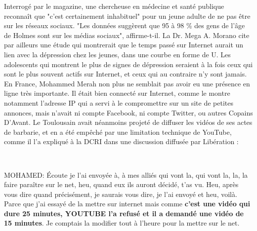 \documentclass[11pt,twoside,a4paper]{article}
\begin{document}
Interrog{\'e} par le magazine, une chercheuse en m{\'e}decine et sant{\'e} publique reconna{\^i}t que "c'est certainement inhabituel" pour un jeune adulte de ne pas {\^e}tre sur les r{\'e}seaux sociaux. "Les donn{\'e}es sugg{\`e}rent que 95 {\`a} 98 \% des gens de l'{\^a}ge de Holmes sont sur les m{\'e}dias sociaux", affirme-t-il. La Dr. Mega A. Morano cite par ailleurs une {\'e}tude qui montrerait que le temps pass{\'e} sur Internet aurait un lien avec la d{\'e}pression chez les jeunes, dans une courbe en forme de U. Les adolescents qui montrent le plus de signes de d{\'e}pression seraient {\`a} la fois ceux qui sont le plus souvent actifs sur Internet, et ceux qui au contraire n'y sont jamais.~\\ 

En France, Mohammed Merah non plus ne semblait pas avoir eu une pr{\'e}sence en ligne tr{\`e}s importante. Il {\'e}tait bien connect{\'e} sur Internet, comme le montre notamment l'adresse IP qui a servi {\`a} le compromettre sur un site de petites annonces, mais n'avait ni compte Facebook, ni compte Twitter, ou autres Copains D'Avant. Le Toulousain avait n{\'e}anmoins projet{\'e} de diffuser les vid{\'e}os de ses actes de barbarie, et en a {\'e}t{\'e} emp{\^e}ch{\'e} par une limitation technique de YouTube, comme il l'a expliqu{\'e} {\`a} la DCRI dans une discussion diffus{\'e}e par Lib{\'e}ration :~\\

\begin{minipage}[t]{2cm} 
	~\\
\end{minipage} \hfill \begin{minipage}[t]{12cm} 
	\footnotesize %
    MOHAMED: {\'E}coute je l'ai envoy{\'e}e {\`a}, {\`a} mes alli{\'e}s qui vont la, qui vont la, la, la faire para{\^i}tre sur le net, heu, quand eux ils auront d{\'e}cid{\'e}, t'as vu. Heu, apr{\`e}s vous dire quand pr{\'e}cis{\'e}ment, je saurais vous dire, je l'ai envoy{\'e} et heu, voil{\`a}. Parce que j'ai essay{\'e} de la mettre sur internet mais comme \textbf{c'est une vid{\'e}o qui dure 25 minutes, YOUTUBE l'a refus{\'e} et il a demand{\'e} une vid{\'e}o de 15 minutes}. Je comptais la modifier tout {\`a} l'heure pour la mettre sur le net.
\end{minipage} \hfill \begin{minipage}[t]{2cm} 
	~\\
\end{minipage} ~\\ ~\\
\end{document}
